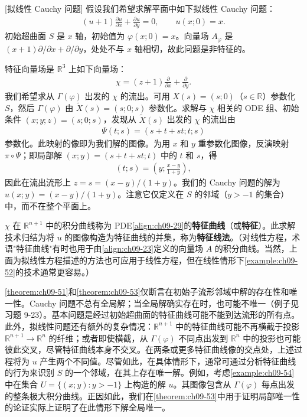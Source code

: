 \documentclass[../../main.tex]{subfiles}
\begin{document}
\begin{example}\label{example:ch09-54}[拟线性 Cauchy 问题]
假设我们希望求解平面中如下拟线性 Cauchy 问题：
\begin{align*}
(u+1)\frac{\partial u}{\partial x}+\frac{\partial u}{\partial y}=0,\qquad u(x;0)=x.
\end{align*}
初始超曲面 $S$ 是 $x$ 轴，初始值为 $\varphi(x;0)=x$。向量场 $A_\varphi$ 是 $(x+1)\partial/\partial x+\partial/\partial y$，处处不与 $x$ 轴相切，故此问题是非特征的。

特征向量场是 $\mathbb{R}^3$ 上如下向量场：
\begin{align*}
\chi=(z+1)\frac{\partial}{\partial x}+\frac{\partial}{\partial y}.
\end{align*}
我们希望求从 $\Gamma(\varphi)$ 出发的 $\chi$ 的流出。可用 $X(s)=(s;0)$（$s\in\mathbb{R}$）参数化 $S$，然后 $\Gamma(\varphi)$ 由 $\widetilde{X}(s)=(s;0;s)$ 参数化。求解与 $\chi$ 相关的 ODE 组、初始条件 $(x;y;z)=(s;0;s)$，发现从 $\widetilde{X}(s)$ 出发的 $\chi$ 的流出由
\begin{align*}
\Psi(t;s)=(s+t+st;t;s)
\end{align*}
参数化。此映射的像即为我们解的图像。为用 $x$ 和 $y$ 重参数化图像，反演映射 $\pi\circ\Psi$；即局部解 $(x;y)=(s+t+st;t)$ 中的 $t$ 和 $s$，得
\begin{align*}
(t;s)=\left(y;\frac{x-y}{1+y}\right),
\end{align*}
因此在流出流形上 $z=s=(x-y)/(1+y)$。我们的 Cauchy 问题的解为 $u(x;y)=(x-y)/(1+y)$。注意它仅定义在 $S$ 的邻域（$y>-1$ 的集合）中，而不在整个平面上。
\end{example}

$\chi$ 在 $\mathbb{R}^{n+1}$ 中的积分曲线称为 PDE\eqref{align:ch09-29}的\textbf{特征曲线}（或\textbf{特征}）。此求解技术归结为将 $u$ 的图像构造为特征曲线的并集，称为\textbf{特征线法}。（对线性方程，术语"特征曲线"有时也用于由\eqref{align:ch09-23}定义的向量场 $A$ 的积分曲线。当然，上面为拟线性方程描述的方法也可应用于线性方程，但在线性情形下\cref{example:ch09-52}的技术通常更容易。）

\cref{theorem:ch09-51}和\cref{theorem:ch09-53}仅断言在初始子流形邻域中解的存在性和唯一性。Cauchy 问题不总有全局解；当全局解确实存在时，也可能不唯一（例子见习题 9-23）。基本问题是经过初始超曲面的特征曲线可能不能到达流形的所有点。此外，拟线性问题还有额外的复杂情况：$\mathbb{R}^{n+1}$ 中的特征曲线可能不再横截于投影 $\mathbb{R}^{n+1}\to\mathbb{R}^n$ 的纤维；或者即使横截，从 $\Gamma(\varphi)$ 不同点出发到 $\mathbb{R}^n$ 中的投影也可能彼此交叉，尽管特征曲线本身不交叉。在两条或更多特征曲线像的交点处，上述过程将为 $u$ 产生两个不同值。尽管如此，在具体情形下，通常可通过分析特征曲线的行为来识别 $S$ 的一个邻域，在其上存在唯一解。例如，考虑\cref{example:ch09-54}中在集合 $U=\{(x;y):y>-1\}$ 上构造的解 $u$。其图像包含从 $\Gamma(\varphi)$ 每点出发的整条极大积分曲线。正因如此，我们在\cref{theorem:ch09-53}中用于证明局部唯一性的论证实际上证明了在此情形下解全局唯一。
\end{document}
